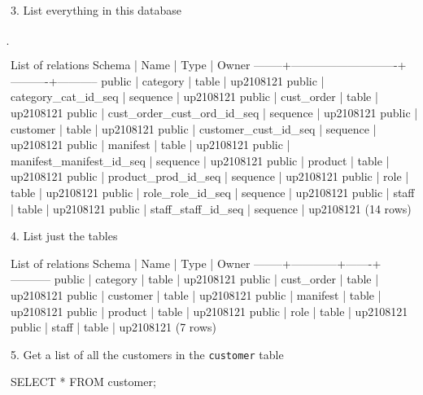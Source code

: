 3. List everything in this database
\begin{sql}
\d
\end{sql}
\begin{pseudo*}
                    List of relations
Schema |            Name            |   Type   |   Owner   
--------+----------------------------+----------+-----------
public | category                   | table    | up2108121
public | category_cat_id_seq        | sequence | up2108121
public | cust_order                 | table    | up2108121
public | cust_order_cust_ord_id_seq | sequence | up2108121
public | customer                   | table    | up2108121
public | customer_cust_id_seq       | sequence | up2108121
public | manifest                   | table    | up2108121
public | manifest_manifest_id_seq   | sequence | up2108121
public | product                    | table    | up2108121
public | product_prod_id_seq        | sequence | up2108121
public | role                       | table    | up2108121
public | role_role_id_seq           | sequence | up2108121
public | staff                      | table    | up2108121
public | staff_staff_id_seq         | sequence | up2108121
(14 rows)
\end{pseudo*}

4. List just the tables
\begin{sql}
\dt
\end{sql}
\begin{pseudo*}
           List of relations
Schema |    Name    | Type  |   Owner   
--------+------------+-------+-----------
public | category   | table | up2108121
public | cust_order | table | up2108121
public | customer   | table | up2108121
public | manifest   | table | up2108121
public | product    | table | up2108121
public | role       | table | up2108121
public | staff      | table | up2108121
(7 rows)
\end{pseudo*}

5. Get a list of all the customers in the \verb|customer| table

\begin{sql}
SELECT * FROM customer;
\end{sql}

